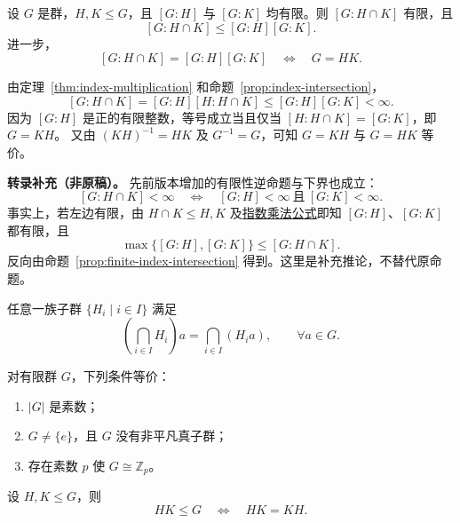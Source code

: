 \begin{proposition}[有限指数子群的交]\label{prop:finite-index-intersection}
设 $G$ 是群，$H,K\leq G$，且 $[G:H]$ 与 $[G:K]$ 均有限。则 $[G:H\cap K]$ 有限，且
\[
  [G:H\cap K]\leq[G:H][G:K].
\]
进一步，
\[
  [G:H\cap K]=[G:H][G:K]\quad\Longleftrightarrow\quad G=HK.
\]
\end{proposition}

\begin{purplenote}
由定理~\ref{thm:index-multiplication} 和命题~\ref{prop:index-intersection}，
\[
  [G:H\cap K]=[G:H][H:H\cap K]
  \leq[G:H][G:K]<\infty.
\]
因为 $[G:H]$ 是正的有限整数，等号成立当且仅当 $[H:H\cap K]=[G:K]$，即 $G=KH$。
又由 $(KH)^{-1}=HK$ 及 $G^{-1}=G$，可知 $G=KH$ 与 $G=HK$ 等价。
\end{purplenote}

\par\textbf{转录补充（非原稿）。}
先前版本增加的有限性逆命题与下界也成立：
\[
  [G:H\cap K]<\infty
  \quad\Longleftrightarrow\quad
  [G:H]<\infty\ \text{且}\ [G:K]<\infty.
\]
事实上，若左边有限，由 $H\cap K\leq H,K$ 及\hyperref[thm:index-multiplication]{指数乘法公式}即知 $[G:H]$、$[G:K]$ 都有限，且
\[
  \max\{[G:H],[G:K]\}\leq[G:H\cap K].
\]
反向由命题~\ref{prop:finite-index-intersection} 得到。这里是补充推论，不替代原命题。

\begin{proposition}\label{prop:coset-of-intersection}
任意一族子群 $\{H_i\mid i\in I\}$ 满足
\[
  \left(\bigcap_{i\in I}H_i\right)a
  =\bigcap_{i\in I}(H_i a),
  \qquad \forall a\in G.
\]
\end{proposition}

\begin{proposition}\label{prop:prime-order-characterizations}
对有限群 $G$，下列条件等价：
\begin{enumerate}[label=(\arabic*)]
  \item $|G|$ 是素数；
  \item $G\neq\{e\}$，且 $G$ 没有非平凡真子群；
  \item 存在素数 $p$ 使 $G\cong\mathbb Z_p$。
\end{enumerate}
\end{proposition}

\begin{theorem}\label{thm:HK-subgroup}
设 $H,K\leq G$，则
\[
  HK\leq G\quad\Longleftrightarrow\quad HK=KH.
\]
\end{theorem}

